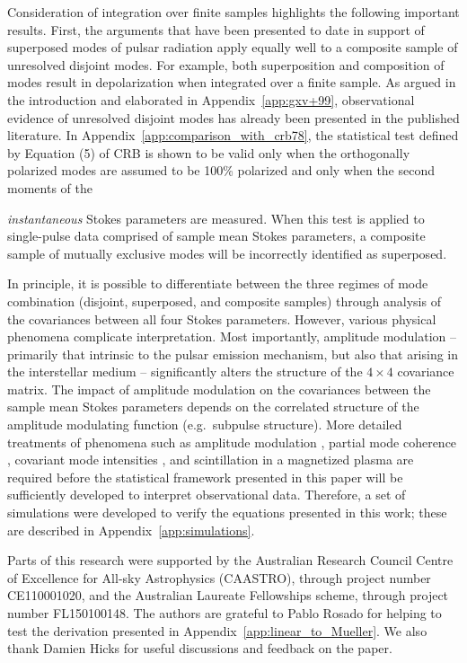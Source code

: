 \documentclass[twocolumn]{aastex6}
\newcommand{\App}[1]{Appendix~\ref{app:#1}}
\begin{document}
Consideration of integration over finite samples highlights the
following important results.  First, the arguments that have been
presented to date in support of superposed modes of pulsar radiation
apply equally well to a composite sample of unresolved disjoint modes.
%
For example, both superposition and composition of modes result in
depolarization when integrated over a finite sample.
%
As argued in the introduction and elaborated in \App{gxv+99},
observational evidence of unresolved disjoint modes has already been
presented in the published literature.
%
In \App{comparison_with_crb78}, the statistical test defined by
Equation (5) of CRB is shown to be valid only when the orthogonally
polarized modes are assumed to be 100\% polarized and only when the
second moments of the {\emph{instantaneous} Stokes parameters are
  measured.
%
When this test is applied to single-pulse data comprised of sample
mean Stokes parameters, a composite sample of mutually exclusive modes
will be incorrectly identified as superposed.


In principle, it is possible to differentiate between the three
regimes of mode combination (disjoint, superposed, and composite
samples) through analysis of the covariances between all four Stokes
parameters.
%
However, various physical phenomena complicate interpretation.
%
Most importantly, amplitude modulation -- primarily that intrinsic to
the pulsar emission mechanism, but also that arising in the
interstellar medium -- significantly alters the structure of the
$4\times4$ covariance matrix.
%
The impact of amplitude modulation on the covariances between the
sample mean Stokes parameters depends on the correlated structure of
the amplitude modulating function (e.g.\ subpulse structure).
%
More detailed treatments of phenomena such as amplitude modulation
\citep[e.g.][]{ovdb13}, partial mode coherence \citep[e.g.][]{gan97},
covariant mode intensities \citep[e.g.][]{ms98}, and scintillation in
a magnetized plasma \citep[e.g.][]{mel93a,mel93b} are required before
the statistical framework presented in this paper will be sufficiently
developed to interpret observational data.
%
Therefore, a set of simulations were developed to verify the equations
presented in this work; these are described in \App{simulations}.



\acknowledgements

%
Parts of this research were supported by the Australian Research
Council Centre of Excellence for All-sky Astrophysics (CAASTRO),
through project number CE110001020, and the Australian Laureate
Fellowships scheme, through project number FL150100148.
%
The authors are grateful to Pablo Rosado for helping to test the
derivation presented in \App{linear_to_Mueller}.  We also thank
Damien Hicks for useful discussions and feedback on the paper.

}
\end{document}
